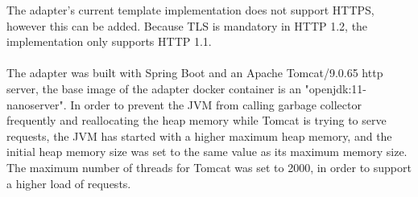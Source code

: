 The adapter's current template implementation does not support HTTPS, however this can be added.
Because TLS is mandatory in HTTP 1.2, the implementation only supports HTTP 1.1.

\paragraph{}

The adapter was built with Spring Boot and an Apache Tomcat/9.0.65 http server, the base image of the adapter docker container is an "openjdk:11-nanoserver".
In order to prevent the JVM from calling garbage collector frequently and reallocating the heap memory while Tomcat is trying to serve requests,
the JVM has started with a higher maximum heap memory, and the initial heap memory
size was set to the same value as its maximum memory size.
The maximum number of threads for Tomcat was set to 2000, in order to support a higher load of requests.

